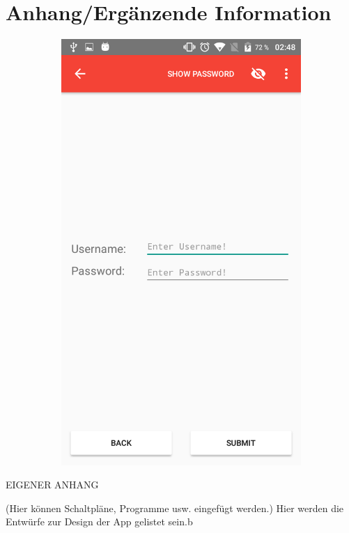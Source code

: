 %
%
% 
% 
\renewcommand*{\lstlistlistingname}{Codeverzeichnis}
\chapter{Anhang/Ergänzende Information}
\label{chap:app}


\begin{figure}[h!]
		\centering
		\begin{subfigure}
			\centering
			\includegraphics[width=.3\textwidth]{images/stm32kb-loginscreen.png}
		\end{subfigure}
		
		\label{fig:nope}
	\end{figure}


EIGENER ANHANG

(Hier können Schaltpläne, Programme usw. eingefügt werden.)
Hier werden die Entwürfe zur Design der App gelistet sein.b
\clearpage


\listoffigures

\clearpage


\lstlistoflistings

\listoftables

